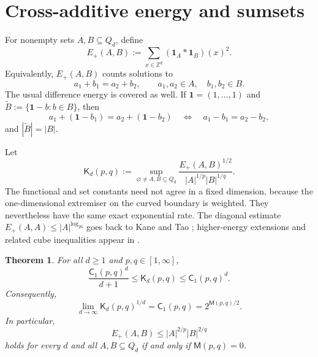 \documentclass[11pt,reqno]{amsart}
\numberwithin{equation}{section}
\newtheorem{theorem}{Theorem}[section]
\theoremstyle{definition}
\theoremstyle{remark}
\newcommand{\Z}{\mathbb Z}
\newcommand{\one}{\mathbf 1}
\newcommand{\Cpqr}{\mathsf C}
\newcommand{\Kpq}{\mathsf K}
\newcommand{\Mu}{\mathsf M}
\newcommand{\logtwo}{\log_2}
\begin{document}
\section{Cross-additive energy and sumsets}\label{sec:additive}

For nonempty sets $A,B\subseteq Q_d$, define
\begin{equation}\label{eq:cross-energy}
  E_+(A,B)
  :=\sum_{x\in\Z^d}(\one_A*\one_B)(x)^2.
\end{equation}
Equivalently, $E_+(A,B)$ counts solutions to
\[
  a_1+b_1=a_2+b_2,
  \qquad a_1,a_2\in A,
  \quad b_1,b_2\in B.
\]
The usual difference energy is covered as well.  If $\boldsymbol 1=(1,\dots,1)$ and
$\widetilde B:=\{\boldsymbol 1-b:b\in B\}$, then
\[
  a_1+(\boldsymbol 1-b_1)=a_2+(\boldsymbol 1-b_2)
  \quad\Longleftrightarrow\quad
  a_1-b_1=a_2-b_2,
\]
and $|\widetilde B|=|B|$.

Let
\begin{equation}\label{eq:K-set-def}
  \Kpq_d(p,q)
  :=\sup_{\varnothing\ne A,B\subseteq Q_d}
  \frac{E_+(A,B)^{1/2}}
  {|A|^{1/p}|B|^{1/q}}.
\end{equation}
The functional and set constants need not agree in a fixed dimension, because the one-dimensional extremiser on the curved boundary is weighted.  They nevertheless have the same exact exponential rate.  The diagonal estimate $E_+(A,A)\le |A|^{\logtwo6}$ goes back to Kane and Tao \cite{KaneTao2017}; higher-energy extensions and related cube inequalities appear in \cite{DGIM,BIMP}.

\begin{theorem}\label{thm:set-rate}
For all $d\ge1$ and $p,q\in[1,\infty]$,
\begin{equation}\label{eq:set-rate-bounds}
  \frac{\Cpqr_1(p,q)^d}{d+1}
  \le \Kpq_d(p,q)
  \le \Cpqr_1(p,q)^d.
\end{equation}
Consequently,
\begin{equation}\label{eq:set-rate-limit}
  \lim_{d\to\infty}\Kpq_d(p,q)^{1/d}
  =\Cpqr_1(p,q)
  =2^{\Mu(p,q)/2}.
\end{equation}
In particular,
\begin{equation}\label{eq:set-energy-region}
  E_+(A,B)\le |A|^{2/p}|B|^{2/q}
\end{equation}
holds for every $d$ and all $A,B\subseteq Q_d$ if and only if $\Mu(p,q)=0$.
\end{theorem}
\end{document}
